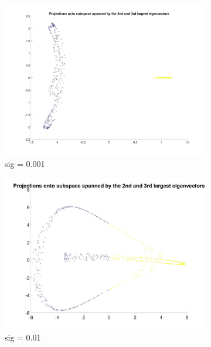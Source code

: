 \documentclass[11pt,oneside,a4paper]{article}
\begin{document}
\begin{figure}[H]
	\begin{subfigure}[b]{0.4\textwidth}
		\includegraphics[width=\textwidth]{../Figures/sig001s}
		\caption{sig = 0.001}
	\end{subfigure}
	\begin{subfigure}[b]{0.4\textwidth}
		\includegraphics[width=\textwidth]{../Figures/sig01s}
		\caption{sig = 0.01}
	\end{subfigure}
	\begin{subfigure}[b]{0.4\textwidth}

\end{subfigure}
\end{figure}
\end{document}
